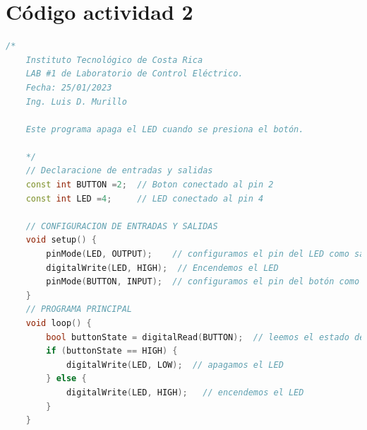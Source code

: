 \section{Código actividad 2}
\label{ApendiceA}
{\scriptsize 
	
	\begin{lstlisting}[language=C++]
	/*
	Instituto Tecnológico de Costa Rica
	LAB #1 de Laboratorio de Control Eléctrico.
	Fecha: 25/01/2023
	Ing. Luis D. Murillo
	
	Este programa apaga el LED cuando se presiona el botón. 
	
	*/
	// Declaracione de entradas y salidas
	const int BUTTON =2;  // Boton conectado al pin 2
	const int LED =4;     // LED conectado al pin 4
	
	// CONFIGURACION DE ENTRADAS Y SALIDAS
	void setup() {
		pinMode(LED, OUTPUT);    // configuramos el pin del LED como salida
		digitalWrite(LED, HIGH);  // Encendemos el LED
		pinMode(BUTTON, INPUT);  // configuramos el pin del botón como entrada
	}
	// PROGRAMA PRINCIPAL
	void loop() {
		bool buttonState = digitalRead(BUTTON);  // leemos el estado del botón
		if (buttonState == HIGH) {
			digitalWrite(LED, LOW);  // apagamos el LED
		} else {
			digitalWrite(LED, HIGH);   // encendemos el LED
		}
	}
	
	\end{lstlisting}
	
}

